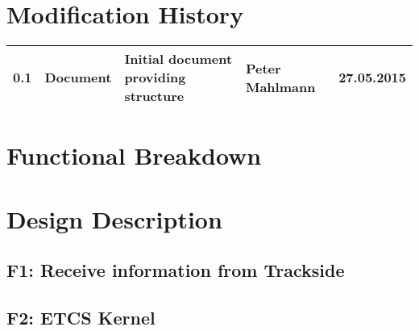 \documentclass{template/openetcs_report}
\begin{document}


\chapter*{Modification History}
\begin{supertabular}{| m{1.2cm} | m{1.5cm} | m{4.0cm} | m{3.5cm} | m{3.5cm} |}
0.1 & Document & Initial document providing structure & Peter Mahlmann& 27.05.2015 \\\hline
\end{supertabular}

\setcounter{tocdepth}{3}


\tableofcontents
\listoffiguresandtables
\newpage




\mainmatter


\chapter{Functional Breakdown}


\chapter{Design Description}

\section{F1: Receive information from Trackside}
\section{F2: ETCS Kernel}

\end{document}
